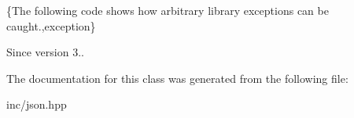 \{The following code shows how arbitrary library exceptions can be caught.,exception\}

\begin{DoxySince}{Since}
version 3.. 
\end{DoxySince}


The documentation for this class was generated from the following file\+:\begin{DoxyCompactItemize}
\item 
inc/json.\+hpp\end{DoxyCompactItemize}
